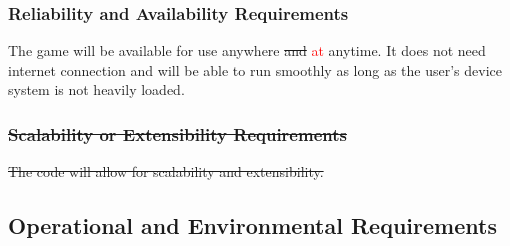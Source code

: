 \documentclass{article}
\begin{document}
\subsubsection{Reliability and Availability Requirements}
The game will be available for use anywhere \st{and} \textcolor{red}{at} anytime. It does not need internet connection and will be able to run smoothly as long as the user’s device system is not heavily loaded.
\subsubsection{\sout{Scalability or Extensibility Requirements}}
\st{The code will allow for scalability and extensibility.}

\subsection{Operational and Environmental Requirements}
\end{document}
